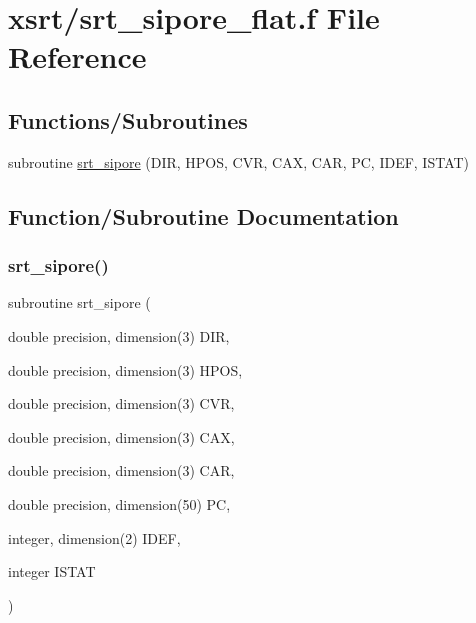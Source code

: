\hypertarget{srt__sipore__flat_8f}{}\section{xsrt/srt\+\_\+sipore\+\_\+flat.f File Reference}
\label{srt__sipore__flat_8f}
\subsection*{Functions/\+Subroutines}
\begin{DoxyCompactItemize}
\item 
subroutine \hyperlink{srt__sipore__flat_8f_aaa092a09b2c7ca77b2d082a751e2464f}{srt\+\_\+sipore} (D\+IR, H\+P\+OS, C\+VR, C\+AX, C\+AR, PC, I\+D\+EF, I\+S\+T\+AT)
\end{DoxyCompactItemize}


\subsection{Function/\+Subroutine Documentation}
\mbox{\label{srt__sipore__flat_8f_aaa092a09b2c7ca77b2d082a751e2464f}} 
\subsubsection{\texorpdfstring{srt\+\_\+sipore()}{srt\_sipore()}}
{\footnotesize\ttfamily subroutine srt\+\_\+sipore (\begin{DoxyParamCaption}\item[{double precision, dimension(3)}]{D\+IR,  }\item[{double precision, dimension(3)}]{H\+P\+OS,  }\item[{double precision, dimension(3)}]{C\+VR,  }\item[{double precision, dimension(3)}]{C\+AX,  }\item[{double precision, dimension(3)}]{C\+AR,  }\item[{double precision, dimension(50)}]{PC,  }\item[{integer, dimension(2)}]{I\+D\+EF,  }\item[{integer}]{I\+S\+T\+AT }\end{DoxyParamCaption})}

